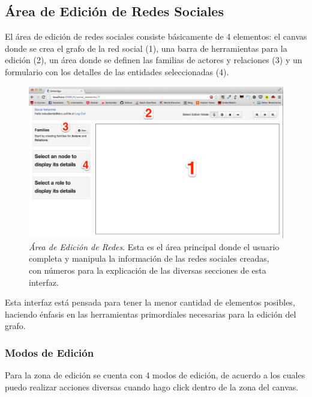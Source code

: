 \subsection{Área de Edición de Redes Sociales} %
\label{sub:area_de_edicion_de_redes_sociales}

El área de edición de redes sociales consiste básicamente de 4 elementos: el canvas donde se crea el grafo de la red social (1), una barra de herramientas para la edición (2), un área donde se definen las familias de actores y relaciones (3) y un formulario con los detalles de las entidades seleccionadas (4).

\begin{figure}[H]
  \includegraphics[width=1.0\textwidth]{images/area_edicion_redes.png}
  \caption[Área de Edición de Redes]{\emph{Área de Edición de Redes}. Esta es el área principal donde el usuario completa y manipula la información de las redes sociales creadas, con números para la explicación de las diversas secciones de esta interfaz.}
  \label{area_edicion_redes}
\end{figure}

Esta interfaz está pensada para tener la menor cantidad de elementos posibles, haciendo énfasis en las herramientas primordiales necesarias para la edición del grafo.

\subsubsection{Modos de Edición} %
\label{ssub:modos_de_edicion}

Para la zona de edición se cuenta con 4 modos de edición, de acuerdo a los cuales puedo realizar acciones diversas cuando hago click dentro de la zona del canvas.

